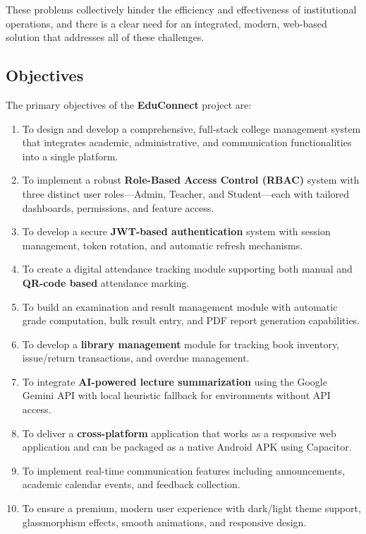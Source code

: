 These problems collectively hinder the efficiency and effectiveness of institutional operations, and there is a clear need for an integrated, modern, web-based solution that addresses all of these challenges.

\subsection{Objectives}

The primary objectives of the \textbf{EduConnect} project are:

\begin{enumerate}[label=\arabic*., leftmargin=2em]
    \item To design and develop a comprehensive, full-stack college management system that integrates academic, administrative, and communication functionalities into a single platform.
    
    \item To implement a robust \textbf{Role-Based Access Control (RBAC)} system with three distinct user roles---Admin, Teacher, and Student---each with tailored dashboards, permissions, and feature access.
    
    \item To develop a secure \textbf{JWT-based authentication} system with session management, token rotation, and automatic refresh mechanisms.
    
    \item To create a digital attendance tracking module supporting both manual and \textbf{QR-code based} attendance marking.
    
    \item To build an examination and result management module with automatic grade computation, bulk result entry, and PDF report generation capabilities.
    
    \item To develop a \textbf{library management} module for tracking book inventory, issue/return transactions, and overdue management.
    
    \item To integrate \textbf{AI-powered lecture summarization} using the Google Gemini API with local heuristic fallback for environments without API access.
    
    \item To deliver a \textbf{cross-platform} application that works as a responsive web application and can be packaged as a native Android APK using Capacitor.
    
    \item To implement real-time communication features including announcements, academic calendar events, and feedback collection.
    
    \item To ensure a premium, modern user experience with dark/light theme support, glassmorphism effects, smooth animations, and responsive design.
\end{enumerate}

